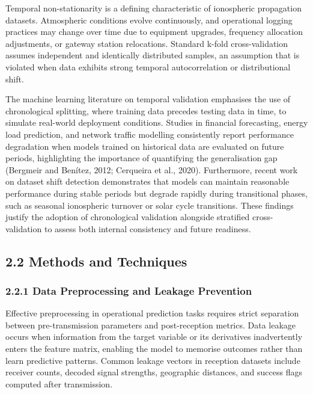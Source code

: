Temporal non-stationarity is a defining characteristic of ionospheric
propagation datasets. Atmospheric conditions evolve continuously, and
operational logging practices may change over time due to equipment
upgrades, frequency allocation adjustments, or gateway station
relocations. Standard k-fold cross-validation assumes independent and
identically distributed samples, an assumption that is violated when
data exhibits strong temporal autocorrelation or distributional shift.

The machine learning literature on temporal validation emphasises the
use of chronological splitting, where training data precedes testing
data in time, to simulate real-world deployment conditions. Studies in
financial forecasting, energy load prediction, and network traffic
modelling consistently report performance degradation when models
trained on historical data are evaluated on future periods, highlighting
the importance of quantifying the generalisation gap (Bergmeir and
Benítez, 2012; Cerqueira et al., 2020). Furthermore, recent work on
dataset shift detection demonstrates that models can maintain reasonable
performance during stable periods but degrade rapidly during
transitional phases, such as seasonal ionospheric turnover or solar
cycle transitions. These findings justify the adoption of chronological
validation alongside stratified cross-validation to assess both internal
consistency and future readiness.

\subsection{2.2 Methods and Techniques}\label{methods-and-techniques}

\subsubsection{2.2.1 Data Preprocessing and Leakage
Prevention}\label{data-preprocessing-and-leakage-prevention}

Effective preprocessing in operational prediction tasks requires strict
separation between pre-transmission parameters and post-reception
metrics. Data leakage occurs when information from the target variable
or its derivatives inadvertently enters the feature matrix, enabling the
model to memorise outcomes rather than learn predictive patterns. Common
leakage vectors in reception datasets include receiver counts, decoded
signal strengths, geographic distances, and success flags computed after
transmission.

